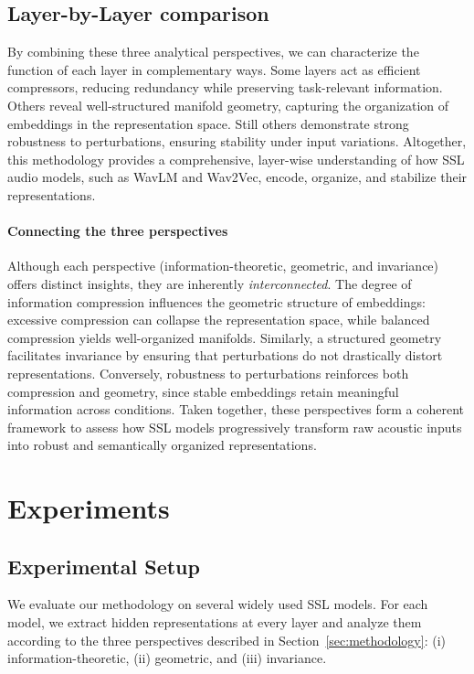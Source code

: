 \documentclass[5p]{elsarticle}
\begin{document}
\subsection{Layer-by-Layer comparison}

By combining these three analytical perspectives, we can characterize the function of each layer in complementary ways. Some layers act as efficient compressors, reducing redundancy while preserving task-relevant information. Others reveal well-structured manifold geometry, capturing the organization of embeddings in the representation space. Still others demonstrate strong robustness to perturbations, ensuring stability under input variations. Altogether, this methodology provides a comprehensive, layer-wise understanding of how SSL audio models, such as WavLM and Wav2Vec, encode, organize, and stabilize their representations.

\paragraph{Connecting the three perspectives}
Although each perspective (information-theoretic, geometric, and invariance) offers distinct insights, they are inherently \emph{interconnected}.
The degree of information compression influences the geometric structure of embeddings: excessive compression can collapse the representation space, while balanced compression yields well-organized manifolds.
Similarly, a structured geometry facilitates invariance by ensuring that perturbations do not drastically distort representations.
Conversely, robustness to perturbations reinforces both compression and geometry, since stable embeddings retain meaningful information across conditions.
Taken together, these perspectives form a coherent framework to assess how SSL models progressively transform raw acoustic inputs into robust and semantically organized representations.


\section{Experiments}
\subsection{Experimental Setup}
We evaluate our methodology on several widely used SSL models. For each model, we extract hidden representations at every layer and analyze them according to the three perspectives described in Section~\ref{sec:methodology}: (i) information-theoretic, (ii) geometric, and (iii) invariance.  
\end{document}
